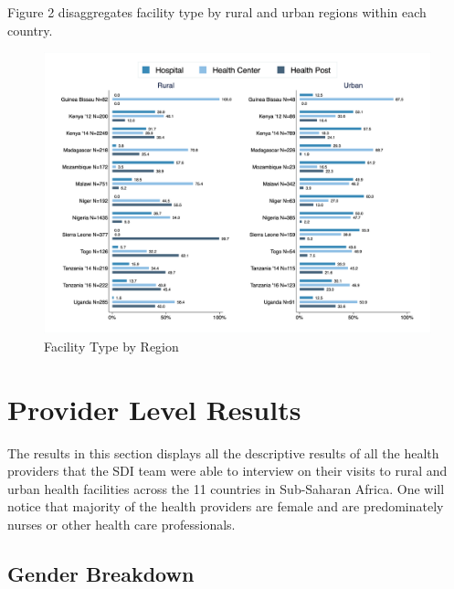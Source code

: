 \documentclass{article}                 %
\begin{document}
	Figure 2 disaggregates facility type by rural and urban regions within each country.  
		
			\begin{figure}[H] 
				\centering
				\caption{Facility Type  by Region} 
				\includegraphics[width=\textwidth]{"../Output/Final/Clinic_reg"}
			\end{figure}
	

	
	\section*{Provider Level Results}
	
	The results in this section displays all the descriptive results of all the health providers that the SDI team were able to interview on their visits to rural and urban health facilities across the 11 countries in Sub-Saharan Africa. One will notice that majority of the health providers are female and are predominately nurses or other health care professionals.
	
	\subsection{Gender Breakdown}
	
\end{document}
